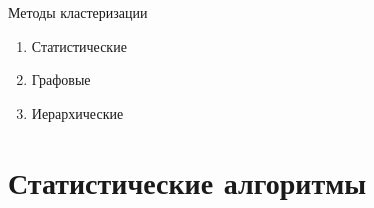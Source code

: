 \documentclass[10pt]{beamer}
\begin{document}
%

\begin{frame}{Методы кластеризации}
	\begin{enumerate} [-]
    \item Статистические 				
		\item Графовые 
		\item Иерархические
	\end{enumerate}
\end{frame}

\section{Статистические алгоритмы}
\end{document}
